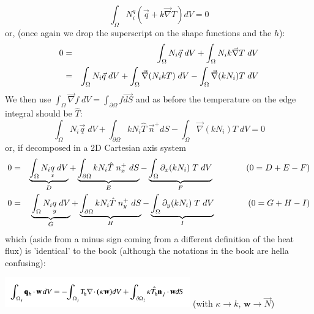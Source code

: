 \[
\int_\Omega N_i^q (\vec{q} + k\vec{\nabla } T ) dV = 0
\]
or, (once again we drop the superscript on the shape functions and the $h$):
\begin{eqnarray}
0 &=& \int_\Omega N_i \vec{q} \;  dV + \int_\Omega N_i k\vec{\nabla } T \; dV \nonumber\\
 &=& \int_\Omega N_i \vec{q} \;  dV + \int_\Omega \vec\nabla (N_i k  T) \; dV - \int_\Omega \vec\nabla (k N_i) T \; dV
\end{eqnarray}
We then use $\int_\Omega \vec\nabla f \; dV = \int_{\partial\Omega} f \vec{dS}$
and as before the temperature on the edge integral should be $\hat{T}$:
\[
\int_\Omega N_i \vec{q} \;  dV + \int_{\partial\Omega}  k N_i \hat{T} \; \vec{n}^+  dS - \int_\Omega \vec\nabla (k N_i)   T \; dV = 0
\]
or, if decomposed in a 2D Cartesian axis system 
\begin{eqnarray}
0
&=& \underbrace{ \int_\Omega N_i  \underset{\tiny x}{q} \; dV }_{D}
+\underbrace{\int_{\partial\Omega} k N_i \hat{T} \; n^+_x \; dS}_{E}
-\underbrace{\int_\Omega \partial_x ( k N_i) \;  T \; dV}_{F} \qquad\qquad  (0=D+E-F)\nonumber\\
0
&=&\underbrace{\int_\Omega N_i  \underset{\tiny y}{q} \; dV}_G 
+\underbrace{\int_{\partial\Omega} k N_i  \hat{T} \; n^+_y \; dS }_{H}
-\underbrace{\int_\Omega \partial_y (k N_i) \;  T \; dV}_I \qquad\qquad  (0=G+H-I)
\end{eqnarray}
which (aside from a minus sign coming from a different definition of the heat flux) is 'identical' to the book
(although the notations in the book are hella confusing):
\begin{center}
\includegraphics[width=8cm]{images/dgfem/li_02} (with $\kappa \rightarrow k$, ${\bm w}\rightarrow \vec{N}$)
\end{center}


